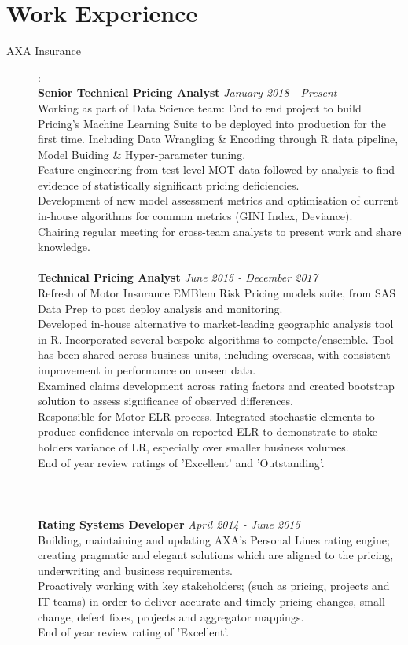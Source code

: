 \documentclass[12pt]{article}
\begin{document}
\section*{Work Experience}
\begin{description}

\item[AXA Insurance]: \\
\textbf{Senior Technical Pricing Analyst} \emph{January 2018 - Present}\\
Working as part of Data Science team: End to end project to build Pricing's Machine Learning Suite to be deployed into production for the first time. Including Data Wrangling \& Encoding through R data pipeline, Model Buiding \& Hyper-parameter tuning. \\
Feature engineering from test-level MOT data followed by analysis to find evidence of statistically significant pricing deficiencies. \\
Development of new model assessment metrics and optimisation of current in-house algorithms for common metrics (GINI Index, Deviance).\\
Chairing regular meeting for cross-team analysts to present work and share knowledge.
\\\\
\textbf{Technical Pricing Analyst} \emph{June 2015 - December 2017}\\
Refresh of Motor Insurance EMBlem Risk Pricing models suite, from SAS Data Prep to post deploy analysis and monitoring. \\
Developed in-house alternative to market-leading geographic analysis tool in R. Incorporated several bespoke algorithms to compete/ensemble. Tool has been shared across business units, including overseas, with consistent improvement in performance on unseen data. \\
Examined claims development across rating factors and created bootstrap solution to assess significance of observed differences. \\
Responsible for Motor ELR process. Integrated stochastic elements to produce confidence intervals on reported ELR to demonstrate to stake holders variance of LR, especially over smaller business volumes. \\
End of year review ratings of 'Excellent' and 'Outstanding'.
\\\\\\\\


\textbf{Rating Systems Developer} \emph{April 2014 - June 2015}\\
Building, maintaining and updating AXA's Personal Lines rating engine; creating pragmatic and elegant solutions which are aligned to the pricing, underwriting and business requirements.\\
Proactively working with key stakeholders; (such as pricing, projects and IT teams) in order to deliver accurate and timely pricing changes, small change, defect fixes, projects and aggregator mappings.\\
End of year review rating of 'Excellent'.


\end{description}
\end{document}
